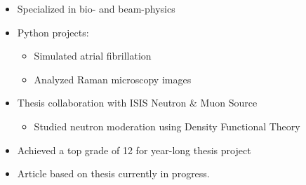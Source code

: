 \documentclass[10pt,a4paper,ragged2e,withhyper]{altacv}
\begin{document}
        

            \begin{multicols}{2}  %
            \begin{itemize}
                \item Specialized in bio- and beam-physics
                \item Python projects:
                    \begin{itemize}
                        \item Simulated atrial fibrillation
                        \item Analyzed Raman microscopy images
                    \end{itemize}
                \item Thesis collaboration with ISIS Neutron \& Muon Source
                    \begin{itemize}
                        \item Studied neutron moderation using Density Functional Theory
                    \end{itemize}
                \item Achieved a top grade of 12 for year-long thesis project
                \item Article based on thesis currently in progress.
            \end{itemize}
            \end{multicols}
            \divider
        


            \divider
            

            \divider


            \divider
\end{document}
